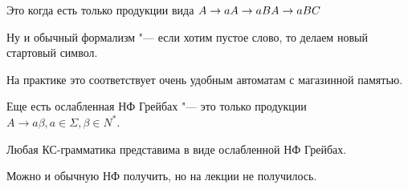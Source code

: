 Это когда есть только продукции вида $\\
A \to a \\
A \to aB \\
A \to aBC$

Ну и обычный формализм "--- если хотим пустое слово, то делаем новый стартовый символ.

На практике это соответствует очень удобным автоматам с магазинной памятью.

Еще есть ослабленная НФ Грейбах "--- это только продукции $A \to a \beta, a \in \Sigma, \beta \in N^*$.

\begin{theorem}
Любая КС-грамматика представима в виде ослабленной НФ Грейбах.
\end{theorem} 
\begin{Rem}
Можно и обычную НФ получить, но на лекции не получилось.
\end{Rem}
